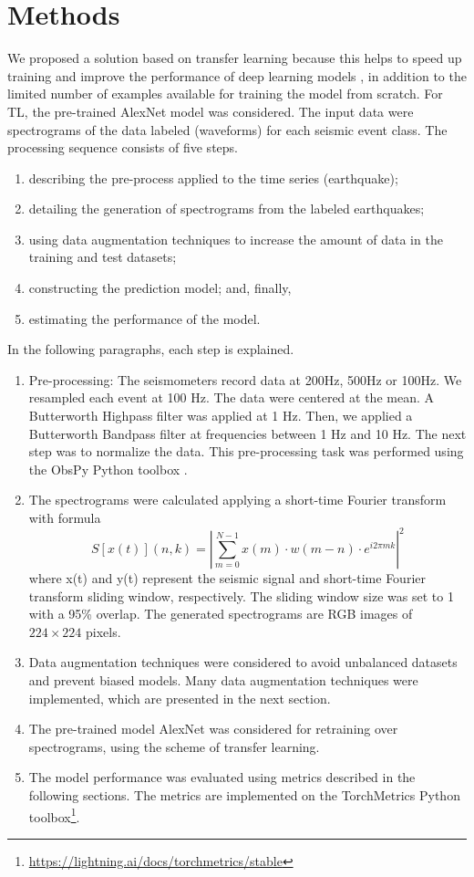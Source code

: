 \documentclass[lettersize,journal]{IEEEtran}
\begin{document}
\section{Methods}\label{methods}
\noindent We proposed a solution based on transfer learning because this helps to speed up training and improve the performance of deep learning models \cite{titos2019classification,bueno2019volcano}, in addition to the limited number of examples available for training the model from scratch. For TL, the pre-trained AlexNet\cite{krizhevsky2012imagenet} model was considered.
The input data were spectrograms of the data labeled (waveforms) for each seismic event class. The processing sequence consists of five steps.
\begin{enumerate}
 \item describing the pre-process applied to the time series (earthquake);
 \item detailing the generation of spectrograms from the labeled earthquakes;
 \item using data augmentation techniques to increase the amount of data in the training and test datasets;
 \item constructing the prediction model; and, finally,
 \item estimating the performance of the model.
\end{enumerate}
In the following paragraphs, each step is explained.
\begin{enumerate}
  \item Pre-processing: The seismometers record data at 200Hz, 500Hz or 100Hz. We resampled each event at 100 Hz. The data were centered at the mean. A Butterworth Highpass filter was applied at 1 Hz. Then, we applied a Butterworth Bandpass filter at frequencies between 1 Hz and 10 Hz. The next step was to normalize the data. This pre-processing task was performed using the ObsPy Python toolbox \cite{beyreuther2010obspy}.
  \item The spectrograms were calculated applying a short-time Fourier transform with formula
  \begin{equation}
    S[x(t)](n,k)=\left|\sum_{m=0}^{N-1}x(m)\cdot w(m-n)\cdot e^{i2\pi mk}\right|^2
  \end{equation}
where x(t) and y(t) represent the seismic signal and short-time Fourier transform sliding window, respectively. The sliding window size was set to 1 with a 95\% overlap. The generated spectrograms are RGB images of $224\times224$ pixels.
  \item Data augmentation techniques were considered to avoid unbalanced datasets and prevent biased models. Many data augmentation techniques were implemented, which are presented in the next section.
  \item The pre-trained model AlexNet\cite{krizhevsky2012imagenet} was considered for retraining over spectrograms, using the scheme of transfer learning.
  \item The model performance was evaluated using metrics described in the following sections. The metrics are implemented on the TorchMetrics Python toolbox\footnote{\href{https://lightning.ai/docs/torchmetrics/stable}{https://lightning.ai/docs/torchmetrics/stable}}.
\end{enumerate}
\end{document}
